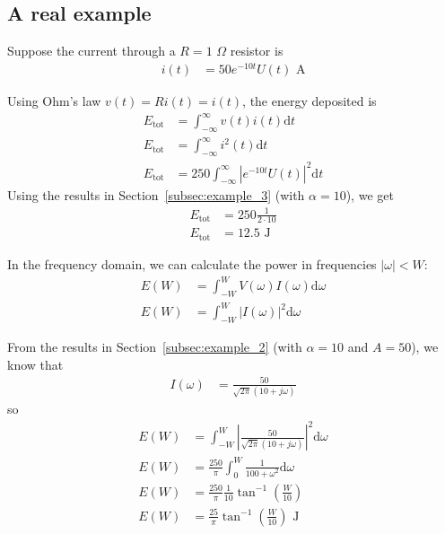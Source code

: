 \documentclass[twocolumn]{myarticle}
\renewcommand{\d}{\mathrm{d}}
\begin{document}
\subsection{A real example}
\label{subsec:a_real_example}

Suppose the current through a $ R = 1 $ $ \Omega $ resistor is
\begin{align}
    i(t) &= 50 e^{-10 t} U(t) \text{ A}
\end{align}

Using Ohm's law $ v(t) = R i(t) = i(t) $, the energy deposited is
\begin{align}
    E_\text{tot} &= \int_{-\infty}^{\infty} v(t) i(t) \d t
    \\
    E_\text{tot} &= \int_{-\infty}^{\infty} i^2(t) \d t
    \\
    E_\text{tot} &= 250 \int_{-\infty}^{\infty} \left| e^{-10 t} U(t) \right|^2 \d t
\end{align}
Using the results in Section~\ref{subsec:example_3} (with $ \alpha = 10 $), we get
\begin{align}
    E_\text{tot} &= 250 \frac{1}{2 \cdot 10}
    \\
    E_\text{tot} &= 12.5 \text{ J}
\end{align}

In the frequency domain, we can calculate the power in frequencies $ |\omega| < W $:
\begin{align}
    E(W) &= \int_{-W}^{W} V(\omega) I(\omega) \d \omega
    \\
    E(W) &= \int_{-W}^{W} \left| I(\omega) \right|^2 \d \omega
\end{align}

From the results in Section~\ref{subsec:example_2} (with $ \alpha = 10 $ and $ A = 50 $), we know that
\begin{align}
    I(\omega) &= \frac{50}{\sqrt{2\pi} ( 10 + j \omega)}
\end{align}
so
\begin{align}
    E(W) &= \int_{-W}^{W} \left| \frac{50}{\sqrt{2\pi} ( 10 + j \omega)} \right|^2 \d \omega
    \\
    E(W) &= \frac{250}{\pi} \int_{0}^{W} \frac{1}{100 + \omega^2} \d \omega
    \\
    E(W) &= \frac{250}{\pi} \frac{1}{10} \tan^{-1} \left( \frac{W}{10} \right)
    \\
    E(W) &= \frac{25}{\pi} \tan^{-1} \left( \frac{W}{10} \right) \text{ J}
\end{align}
\end{document}
